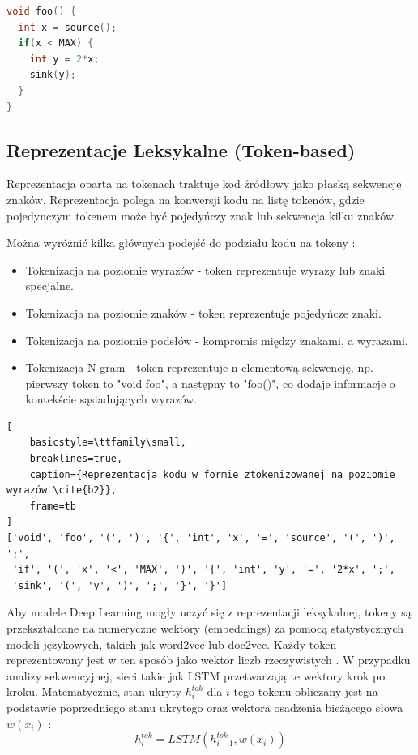 \documentclass[conference]{IEEEtran}
\begin{document}
\begin{lstlisting}[language=C, caption={Przykład kodu źródłowego do analizy reprezentacji \cite{b2}}]
void foo() {
  int x = source();
  if(x < MAX) {
    int y = 2*x;
    sink(y);
  }
}
\end{lstlisting}

\subsection{Reprezentacje Leksykalne (Token-based)}
Reprezentacja oparta na tokenach traktuje kod źródłowy jako płaską sekwencję znaków. Reprezentacja polega na konwersji kodu na listę tokenów, gdzie pojedynczym tokenem może być pojedyńczy znak lub sekwencja kilku znaków.

Można wyróżnić kilka głównych podejść do podziału kodu na tokeny \cite{b1}:
\begin{itemize}
    \item Tokenizacja na poziomie wyrazów - token reprezentuje wyrazy lub znaki specjalne.
    \item Tokenizacja na poziomie znaków - token reprezentuje pojedyńcze znaki.
    \item Tokenizacja na poziomie podsłów - kompromis między znakami, a wyrazami.
    \item Tokenizacja N-gram - token reprezentuje n-elementową sekwencję, np. pierwszy token to "void foo", a następny to "foo()", co dodaje informacje o kontekście sąsiadujących wyrazów.
\end{itemize}

\begin{lstlisting}[
    basicstyle=\ttfamily\small,
    breaklines=true,
    caption={Reprezentacja kodu w formie ztokenizowanej na poziomie wyrazów \cite{b2}},
    frame=tb
]
['void', 'foo', '(', ')', '{', 'int', 'x', '=', 'source', '(', ')', ';', 
 'if', '(', 'x', '<', 'MAX', ')', '{', 'int', 'y', '=', '2*x', ';', 
 'sink', '(', 'y', ')', ';', '}', '}']
\end{lstlisting}

Aby modele Deep Learning mogły uczyć się z reprezentacji leksykalnej, tokeny są przekształcane na numeryczne wektory (embeddings) za pomocą statystycznych modeli językowych, takich jak word2vec lub doc2vec. Każdy token reprezentowany jest w ten sposób jako wektor liczb rzeczywistych \cite{b2}. W przypadku analizy sekwencyjnej, sieci takie jak LSTM przetwarzają te wektory krok po kroku. Matematycznie, stan ukryty $h_i^{tok}$ dla $i$-tego tokenu obliczany jest na podstawie poprzedniego stanu ukrytego oraz wektora osadzenia bieżącego słowa $w(x_i)$ \cite{b4}:
\begin{equation}
h_{i}^{tok} = LSTM(h_{i-1}^{tok}, w(x_{i}))
\end{equation}
\end{document}
